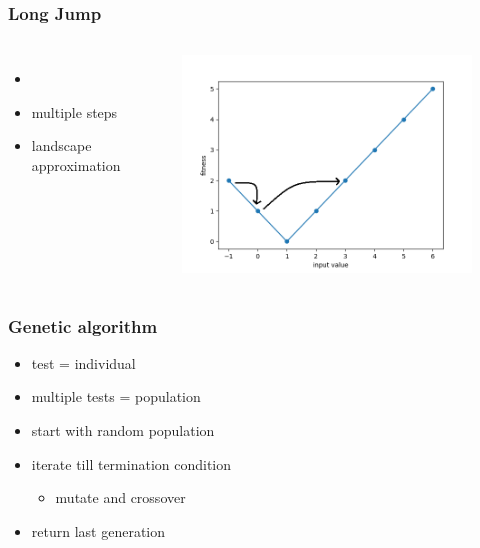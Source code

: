 \begin{frame}
	\frametitle{Long Jump}
	
	\begin{columns}[c]
		

		\begin{itemize}
			\item \cite{Kauffman.1987}
			\item multiple steps
			\item landscape approximation
		\end{itemize}
		
		\begin{figure}
			\includegraphics[width=1\textwidth]{figures/long_jump}
		\end{figure}

	\end{columns}
	
\end{frame}

\begin{frame}
	\frametitle{Genetic algorithm}
		
	\begin{itemize}
		\item test = individual
		\item multiple tests = population
		\item start with random population
		\item iterate till termination condition
		\begin{itemize}
			\item mutate and crossover
		\end{itemize}
		\item return last generation
	\end{itemize}
		
	
\end{frame}


